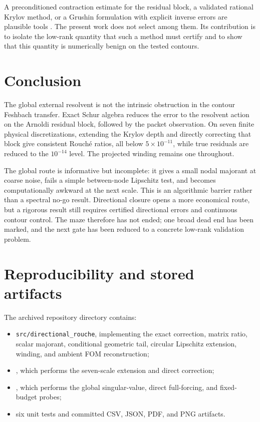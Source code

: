 \documentclass[11pt]{article}
\theoremstyle{definition}
\theoremstyle{remark}
\begin{document}
A preconditioned contraction estimate for the residual block, a validated
rational Krylov method, or a Grushin formulation with explicit inverse
errors are plausible tools \citep{SjoestrandZworski2007,TrefethenEmbree2005}.
The present work does not select among them.  Its contribution is to isolate
the low-rank quantity that such a method must certify and to show that this
quantity is numerically benign on the tested contours.

\section{Conclusion}
\label{sec:conclusion}

The global external resolvent is not the intrinsic obstruction in the
contour Feshbach transfer.  Exact Schur algebra reduces the error to the
resolvent action on the Arnoldi residual block, followed by the packet
observation.  On seven finite physical discretizations, extending the
Krylov depth and directly correcting that block give consistent Rouch\'e
ratios, all below \(5\times10^{-11}\), while true residuals are reduced to
the \(10^{-14}\) level.  The projected winding remains one throughout.

The global route is informative but incomplete: it gives a small nodal
majorant at coarse noise, fails a simple between-node Lipschitz test, and
becomes computationally awkward at the next scale.  This is an algorithmic
barrier rather than a spectral no-go result.  Directional closure opens a
more economical route, but a rigorous result still requires certified
directional errors and continuous contour control.  The maze therefore has
not ended; one broad dead end has been marked, and the next gate has been
reduced to a concrete low-rank validation problem.

\appendix

\section{Reproducibility and stored artifacts}
\label{app:reproducibility}

The archived repository directory \citep{WangDirectionalCode2026} contains:

\begin{itemize}
 \item \texttt{src/directional\_rouche}, implementing the exact correction,
 matrix ratio, scalar majorant, conditional geometric tail, circular
 Lipschitz extension, winding, and ambient FOM reconstruction;
 \item {}, which
 performs the seven-scale extension and direct correction;
 \item {}, which performs
 the global singular-value, direct full-forcing, and fixed-budget probes;
 \item six unit tests and committed CSV, JSON, PDF, and PNG artifacts.
\end{itemize}
\end{document}
